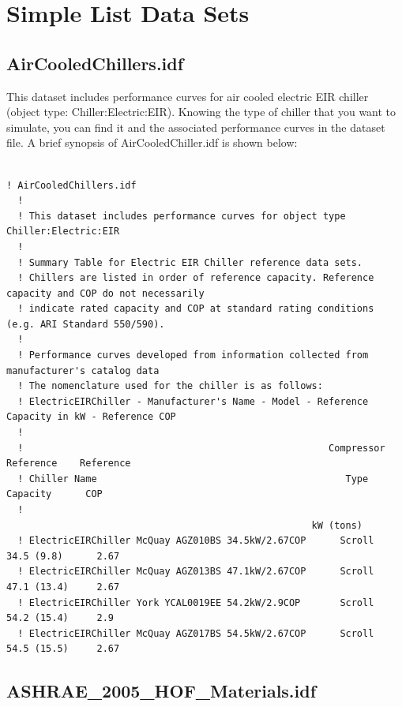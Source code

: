 \section{Simple List Data Sets}\label{simple-list-data-sets}

\subsection{AirCooledChillers.idf}\label{aircooledchillers.idf}

This dataset includes performance curves for air cooled electric EIR chiller (object type: Chiller:Electric:EIR). Knowing the type of chiller that you want to simulate, you can find it and the associated performance curves in the dataset file. A brief synopsis of AirCooledChiller.idf is shown below:

\begin{lstlisting}

! AirCooledChillers.idf
  !
  ! This dataset includes performance curves for object type Chiller:Electric:EIR
  !
  ! Summary Table for Electric EIR Chiller reference data sets.
  ! Chillers are listed in order of reference capacity. Reference capacity and COP do not necessarily
  ! indicate rated capacity and COP at standard rating conditions (e.g. ARI Standard 550/590).
  !
  ! Performance curves developed from information collected from manufacturer's catalog data
  ! The nomenclature used for the chiller is as follows:
  ! ElectricEIRChiller - Manufacturer's Name - Model - Reference Capacity in kW - Reference COP
  !
  !                                                      Compressor   Reference    Reference
  ! Chiller Name                                            Type       Capacity      COP
  !                                                                    kW (tons)
  ! ElectricEIRChiller McQuay AGZ010BS 34.5kW/2.67COP      Scroll     34.5 (9.8)      2.67
  ! ElectricEIRChiller McQuay AGZ013BS 47.1kW/2.67COP      Scroll     47.1 (13.4)     2.67
  ! ElectricEIRChiller York YCAL0019EE 54.2kW/2.9COP       Scroll     54.2 (15.4)     2.9
  ! ElectricEIRChiller McQuay AGZ017BS 54.5kW/2.67COP      Scroll     54.5 (15.5)     2.67
\end{lstlisting}

\subsection{ASHRAE\_2005\_HOF\_Materials.idf}\label{ashraeux5f2005ux5fhofux5fmaterials.idf}

